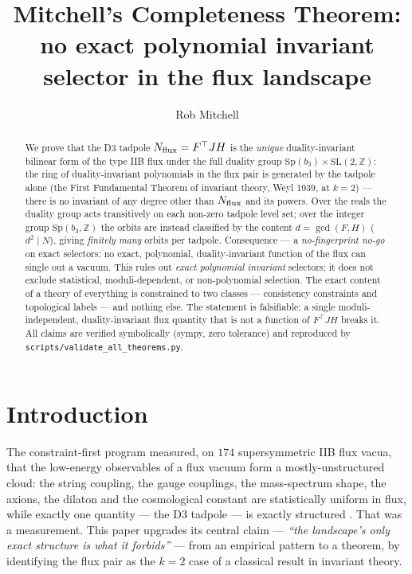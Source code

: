 \documentclass[11pt]{article}
\title{Mitchell's Completeness Theorem: no exact polynomial invariant selector in the flux landscape}
\author{Rob Mitchell}
\date{}
\newcommand{\bthree}{b_3}
\newcommand{\flux}{F}
\newcommand{\hh}{H}
\begin{document}
\maketitle

\begin{abstract}
We prove that the D3 tadpole $N_{\rm flux}=\flux^\top J \hh$ is the \emph{unique}
duality-invariant bilinear form of the type IIB flux under the full duality group
$\mathrm{Sp}(\bthree)\times\mathrm{SL}(2,\mathbb{Z})$: the ring of duality-invariant
polynomials in the flux pair is generated by the tadpole alone (the First Fundamental
Theorem of invariant theory, Weyl 1939, at $k=2$) --- there is no invariant of any
degree other than $N_{\rm flux}$ and its powers. Over the reals the duality group acts
transitively on each non-zero tadpole level set; over the integer group
$\mathrm{Sp}(\bthree,\mathbb{Z})$ the orbits are instead classified by the content
$d=\gcd(F,H)$ ($d^2\mid N$), giving \emph{finitely many} orbits per tadpole. Consequence
--- a \emph{no-fingerprint no-go} on exact selectors: no exact, polynomial,
duality-invariant function of the flux can single out a vacuum. This rules out
\emph{exact polynomial invariant} selectors; it does not exclude statistical, moduli-dependent, or
non-polynomial selection. The exact content of a theory of everything is constrained to
two classes --- consistency constraints and topological labels --- and nothing else. The
statement is falsifiable: a single moduli-independent, duality-invariant flux quantity
that is not a function of $F^\top J H$ breaks it. All claims are verified symbolically
(sympy, zero tolerance) and reproduced by \texttt{scripts/validate\_all\_theorems.py}.
\end{abstract}

\section{Introduction}

The constraint-first program measured, on $174$ supersymmetric IIB flux vacua, that
the low-energy observables of a flux vacuum form a mostly-unstructured cloud: the
string coupling, the gauge couplings, the mass-spectrum shape, the axions, the
dilaton and the cosmological constant are statistically uniform in flux, while
exactly one quantity --- the D3 tadpole --- is exactly structured
\cite{constraint-first}. That was a measurement. This paper upgrades its central
claim --- \emph{``the landscape's only exact structure is what it forbids''} --- from
an empirical pattern to a theorem, by identifying the flux pair as the $k=2$ case of
a classical result in invariant theory.
\end{document}
